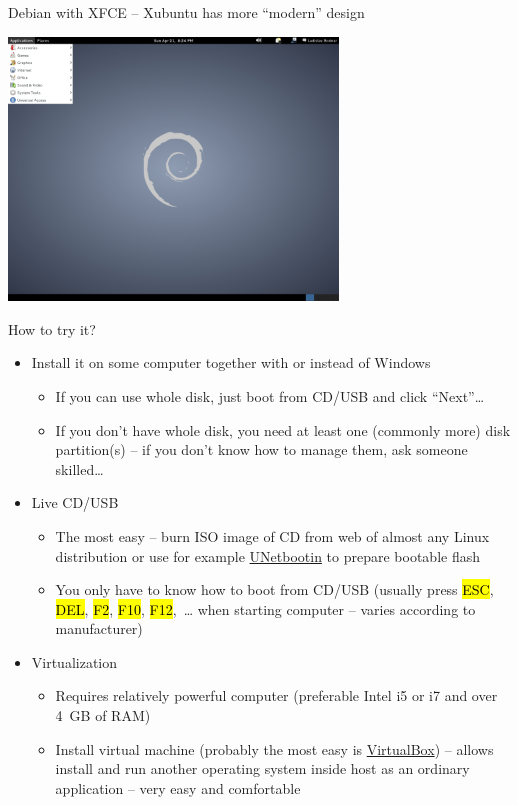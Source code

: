 \documentclass[compress, ucs, xelatex, 11pt, xcolor=svgnames,
  hyperref={
    bookmarks=true,
    unicode=true,
    colorlinks=true,
    pdftitle={Linux, command line and MetaCentrum},
    plainpages=false,
    pdfauthor={Vojtech Zeisek},
    pdfsubject={Course about use of Linux command line, writing shell scripts and using MetaCentrum of CESNET},
    pdfcreator={XeLaTeX},
    pdfkeywords={Linux, GNU, BASH, shell, command line, MetaCentrum},
    linkcolor=DarkRed,
    anchorcolor=DarkBlue,
    citecolor=Indigo,
    filecolor=NavyBlue,
    menucolor=DarkMagenta,
    urlcolor=DarkBlue,
    pdftex},
  url={hyphens, lowtilde} %
  ]{beamer}
\renewcommand{\texttt}[1]{\hl{\ttfamily #1}}
\begin{document}
\begin{frame}{Debian with XFCE -- Xubuntu has more ``modern'' design}
  \begin{center}
    \includegraphics[height=7cm]{debian.png}
  \end{center}
\end{frame}

\begin{frame}{How to try it?}
  \begin{itemize}
    \item Install it on some computer together with or instead of Windows
    \begin{itemize}
      \item If you can use whole disk, just boot from CD/USB and click ``Next''\ldots
      \item If you don't have whole disk, you need at least one (commonly more) disk partition(s) -- if you don't know how to manage them, ask someone skilled\ldots
    \end{itemize}
    \item Live CD/USB
    \begin{itemize}
      \item The most easy -- burn ISO image of CD from web of almost any Linux distribution or use for example \href{https://unetbootin.github.io/}{UNetbootin} to prepare bootable flash
      \item You only have to know how to boot from CD/USB (usually press \texttt{ESC}, \texttt{DEL}, \texttt{F2}, \texttt{F10}, \texttt{F12},~\ldots{ }when starting computer -- varies according to manufacturer)
    \end{itemize}
    \item Virtualization
    \begin{itemize}
      \item Requires relatively powerful computer (preferable Intel i5 or i7 and over 4~GB of RAM)
      \item Install virtual machine (probably the most easy is \href{https://www.virtualbox.org/}{VirtualBox}) -- allows install and run another operating system inside host as an ordinary application -- very easy and comfortable
    \end{itemize}
  \end{itemize}
\end{frame}
\end{document}
